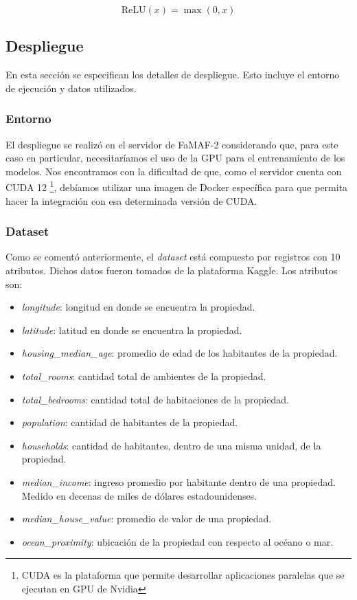 \documentclass[11pt]{article}
\let\Oldsubsection\subsection
\renewcommand{\subsection}{\FloatBarrier\Oldsubsection}
\let\Oldsubsubsection\subsubsection
\renewcommand{\subsubsection}{\FloatBarrier\Oldsubsubsection}
\newcommand{\english}[1]{\textit{#1}}
\begin{document}
\begin{equation}
\text{ReLU}(x) = \max(0, x)
\end{equation}


\subsection{Despliegue}

En esta sección se especifican los detalles de despliegue. Esto incluye el entorno de ejecución y datos utilizados.

\subsubsection{Entorno}

El despliegue se realizó en el servidor de FaMAF-2 considerando que, para este caso en particular, necesitaríamos el uso de la GPU para el entrenamiento de los modelos. Nos encontramos con la dificultad de que, como el servidor cuenta con CUDA 12 \footnote{CUDA es la plataforma que permite desarrollar aplicaciones paralelas que se ejecutan en GPU de Nvidia}, debíamos utilizar una imagen de Docker específica para que permita hacer la integración con esa determinada versión de CUDA.

\subsubsection{Dataset}

Como se comentó anteriormente, el \english{dataset} está compuesto por  registros con 10 atributos. Dichos datos fueron tomados de la plataforma Kaggle. Los atributos son:

\begin{itemize}
    \item \english{longitude}: longitud en donde se encuentra la propiedad.
    \item \english{latitude}: latitud en donde se encuentra la propiedad.
    \item \english{housing\_median\_age}: promedio de edad de los habitantes de la propiedad.
    \item \english{total\_rooms}: cantidad total de ambientes de la propiedad.
    \item \english{total\_bedrooms}: cantidad total de habitaciones de la propiedad.
    \item \english{population}: cantidad de habitantes de la propiedad.
    \item \english{households}: cantidad de habitantes, dentro de una misma unidad, de la propiedad.
    \item \english{median\_income}: ingreso promedio por habitante dentro de una propiedad. Medido en decenas de miles de dólares estadounidenses.
    \item \english{median\_house\_value}: promedio de valor de una propiedad.
    \item \english{ocean\_proximity}: ubicación de la propiedad con respecto al océano o mar.
\end{itemize}
\end{document}
